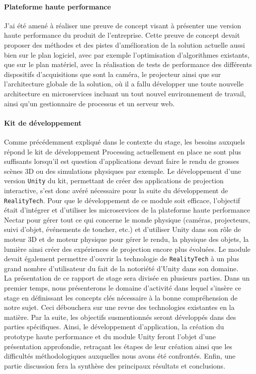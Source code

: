 \paragraph{Plateforme haute performance} J'ai été amené à réaliser une preuve de concept visant à présenter une version haute performance du produit de l'entreprise. Cette preuve de concept devait proposer des méthodes et des pistes d'amélioration de la solution actuelle aussi bien sur le plan logiciel, avec par exemple l'optimisation d'algorithmes existants, que sur le plan matériel, avec la réalisation de tests de performance des différents dispositifs d'acquisitions que sont la caméra, le projecteur ainsi que sur l'architecture globale de la solution, où il a fallu développer une toute nouvelle architecture en microservices incluant un tout nouvel environnement de travail, ainsi qu'un gestionnaire de processus et un serveur web.

\paragraph{Kit de développement} Comme précédemment expliqué dans le contexte du stage, les besoins auxquels répond le kit de développement Processing actuellement en place ne sont plus suffisants lorsqu'il est question d'applications devant faire le rendu de grosses scènes 3D ou des simulations physiques par exemple. Le développement d'une version \texttt{Unity} du kit, permettant de créer des applications de projection interactive, s'est donc avéré nécessaire pour la suite du développement de \texttt{RealityTech}. Pour que le développement de ce module soit efficace, l'objectif était d'intégrer et d'utiliser les microservices de la plateforme haute performance Nectar pour gérer tout ce qui concerne le monde physique (caméras, projecteurs, suivi d'objet, événements de toucher, etc.) et d'utiliser Unity dans son rôle de moteur 3D et de moteur physique pour gérer le rendu, la physique des objets, la lumière ainsi créer des expériences de projection encore plus évoluées. Le module devait également permettre d'ouvrir la technologie de \texttt{RealityTech} à un plus grand nombre d'utilisateur du fait de la notoriété d'Unity dans son domaine.\\

La présentation de ce rapport de stage sera divisée en plusieurs parties. Dans un premier temps, nous présenterons le domaine d'activité dans lequel s'insère ce stage en définissant les concepts clés nécessaire à la bonne compréhension de notre sujet. Ceci débouchera sur une revue des technologies existantes en la matière. Par la suite, les objectifs susmentionnés seront développés dans des parties spécifiques. Ainsi, le développement d'application, la création du prototype haute performance et du module Unity feront l'objet d'une présentation approfondie, retraçant les étapes de leur création ainsi que les difficultés méthodologiques auxquelles nous avons été confrontés. Enfin, une partie discussion fera la synthèse des principaux résultats et conclusions.